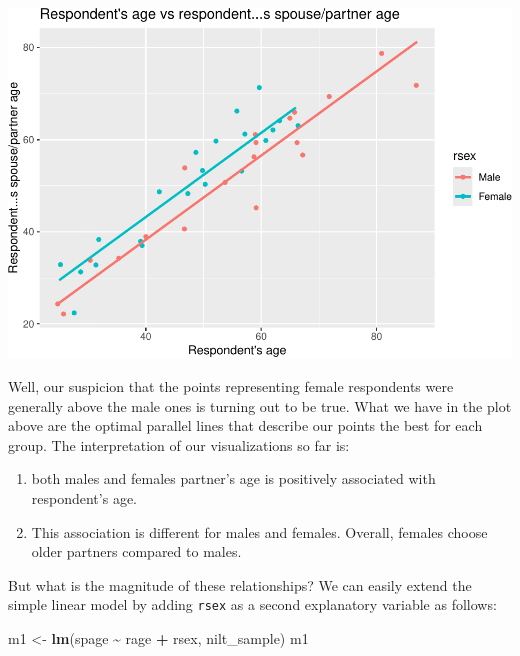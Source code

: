 \documentclass[
]{book}
\newenvironment{Shaded}{\begin{snugshade}}{\end{snugshade}}
\newcommand{\FunctionTok}[1]{\textcolor[rgb]{0.13,0.29,0.53}{\textbf{#1}}}
\newcommand{\NormalTok}[1]{#1}
\newcommand{\OtherTok}[1]{\textcolor[rgb]{0.56,0.35,0.01}{#1}}
\newcommand{\SpecialCharTok}[1]{\textcolor[rgb]{0.81,0.36,0.00}{\textbf{#1}}}
\providecommand{\tightlist}{%
  \setlength{\itemsep}{0pt}\setlength{\parskip}{0pt}}
\begin{document}
\begin{flushleft}\includegraphics[width=1\linewidth]{lab-workbook_files/figure-latex/unnamed-chunk-103-1} \end{flushleft}

Well, our suspicion that the points representing female respondents were generally above the male ones is turning out to be true. What we have in the plot above are the optimal parallel lines that describe our points the best for each group. The interpretation of our visualizations so far is:

\begin{enumerate}
\def\labelenumi{\arabic{enumi}.}
\tightlist
\item
  both males and females partner's age is positively associated with respondent's age.
\item
  This association is different for males and females. Overall, females choose older partners compared to males.
\end{enumerate}

But what is the magnitude of these relationships? We can easily extend the simple linear model by adding \texttt{rsex} as a second explanatory variable as follows:

\begin{Shaded}
\begin{Highlighting}[]
\NormalTok{m1 }\OtherTok{\textless{}{-}} \FunctionTok{lm}\NormalTok{(spage }\SpecialCharTok{\textasciitilde{}}\NormalTok{ rage }\SpecialCharTok{+}\NormalTok{ rsex, nilt\_sample)}
\NormalTok{m1}
\end{Highlighting}
\end{Shaded}
\end{document}
